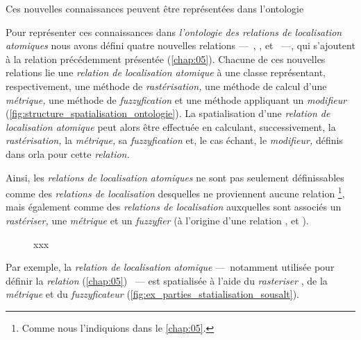 Ces nouvelles connaissances peuvent être représentées dans l'ontologie

Pour représenter ces connaissances dans \emph{l'ontologie des relations de localisation atomiques} nous avons défini quatre nouvelles relations ---~, ,  et ~---, qui s'ajoutent à la relation  précédemment présentée (\autoref{chap:05}). Chacune de ces nouvelles relations lie une \emph{relation de localisation atomique} à une classe représentant, respectivement, une méthode de \emph{rastérisation,} une méthode de calcul d'une \emph{métrique,} une méthode de \emph{fuzzyfication} et une méthode appliquant un \emph{modifieur} (\autoref{fig:structure_spatialisation_ontologie}). La spatialisation d'une \emph{relation de localisation atomique} peut alors être effectuée en calculant, successivement, la \emph{rastérisation,} la \emph{métrique,} sa \emph{fuzzyfication} et, le cas échant, le \emph{modifieur,} définis dans \ac{orla} pour cette \emph{relation.}

Ainsi, les \emph{relations de localisation atomiques} ne sont pas seulement définissables comme des \emph{relations de localisation} desquelles ne proviennent aucune relation  \footnote{Comme nous l'indiquions dans le \autoref{chap:05}.}, mais également comme des \emph{relations de localisation} auxquelles sont associés un \emph{rastériser,} une \emph{métrique} et un \emph{fuzzyfier} (\ie à l'origine d'une relation ,  et ).

\begin{figure}
  \centering
  
  \caption{xxx}
  \label{fig:structure_spatialisation_ontologie}
\end{figure}

Par exemple, la \emph{relation de localisation atomique}  ---~notamment utilisée pour définir la \emph{relation}  (\autoref{chap:05}) ~--- est spatialisée à l'aide du \emph{rasteriser} , de la \emph{métrique}  et du \emph{fuzzyficateur}  (\autoref{fig:ex_parties_statialisation_sousalt}).


